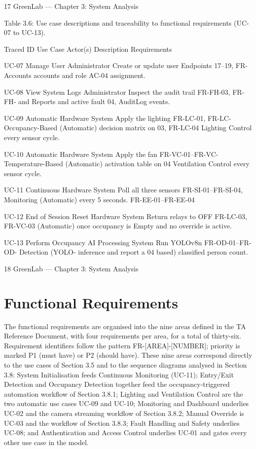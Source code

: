 17
GreenLab --- Chapter 3: System Analysis


Table 3.6: Use case descriptions and traceability to functional requirements (UC-07 to UC-13).

Traced
ID Use Case Actor(s) Description Requirements

UC-07 Manage User Administrator Create or update user Endpoints 17--19, FR-
Accounts accounts and role AC-04
assignment.

UC-08 View System Logs Administrator Inspect the audit trail FR-FH-03, FR-FH-
and Reports and active fault 04, AuditLog
events.

UC-09 Automatic Hardware System Apply the lighting FR-LC-01, FR-LC-
Occupancy-Based (Automatic) decision matrix on 03, FR-LC-04
Lighting Control every sensor cycle.

UC-10 Automatic Hardware System Apply the fan FR-VC-01--FR-VC-
Temperature-Based (Automatic) activation table on 04
Ventilation Control every sensor cycle.

UC-11 Continuous Hardware System Poll all three sensors FR-SI-01--FR-SI-04,
Monitoring (Automatic) every 5 seconds. FR-EE-01--FR-EE-04

UC-12 End of Session Reset Hardware System Return relays to OFF FR-LC-03, FR-VC-03
(Automatic) once occupancy is
Empty and no
override is active.

UC-13 Perform Occupancy AI Processing System Run YOLOv8n FR-OD-01--FR-OD-
Detection (YOLO- inference and report a 04
based) classified person
count.




18
GreenLab --- Chapter 3: System Analysis



\section{Functional Requirements}

The functional requirements are organised into the nine areas defined in the TA Reference
Document, with four requirements per area, for a total of thirty-six. Requirement identifiers follow
the pattern FR-[AREA]-[NUMBER]; priority is marked P1 (must have) or P2 (should have). These
nine areas correspond directly to the use cases of Section 3.5 and to the sequence diagrams
analysed in Section 3.8: System Initialisation feeds Continuous Monitoring (UC-11); Entry/Exit
Detection and Occupancy Detection together feed the occupancy-triggered automation workflow of
Section 3.8.1; Lighting and Ventilation Control are the two automatic use cases UC-09 and UC-10;
Monitoring and Dashboard underlies UC-02 and the camera streaming workflow of Section 3.8.2;
Manual Override is UC-03 and the workflow of Section 3.8.3; Fault Handling and Safety underlies
UC-08; and Authentication and Access Control underlies UC-01 and gates every other use case in
the model.

